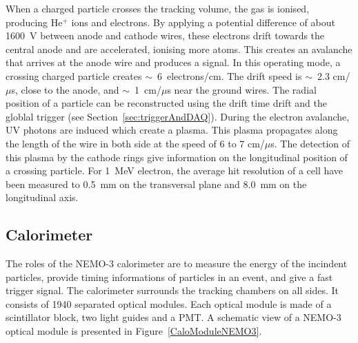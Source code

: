 \documentclass[main.tex]{subfiles}
\begin{document}
\NI When a charged particle crosses the tracking volume, the gas is ionised, producing He$^{+}$ ions and electrons. By applying a potential difference of about 1600~V between anode and cathode wires, these electrons drift towards the central anode and are accelerated, ionising more atoms. This creates an avalanche that arrives at the anode wire and produces a signal. In this operating mode, a crossing charged particle creates $\sim$~6~electrons/cm. The drift speed is $\sim$~2.3 cm/$\mu$s, close to the anode, and $\sim$~1~cm/$\mu$s near the ground wires. The radial position of a particle can be reconstructed using the drift time drift and the globlal trigger (see Section~\ref{sec:triggerAndDAQ}). During the electron avalanche, UV photons are induced which create a plasma. This plasma propagates along the length of the wire in both side at the speed of 6 to 7 cm/$\mu$s. The detection of this plasma by the cathode rings give information on the longitudinal position of a crossing particle. For 1~MeV electron, the average hit resolution of a cell have been measured to 0.5~mm on the transversal plane and 8.0~mm on the longitudinal axis.


\subsection{Calorimeter}


\NI The roles of the NEMO-3 calorimeter are to measure the energy of the incindent particles, provide timing informations of particles in an event, and give a fast trigger signal. The calorimeter surrounds the tracking chambers on all sides. It consists of 1940 separated optical modules. Each optical module is made of a scintillator block, two light guides and a PMT. A schematic view of a NEMO-3 optical module is presented in Figure~\ref{CaloModuleNEMO3}.	


\bigskip
\end{document}
